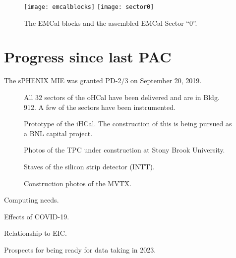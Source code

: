 \begin{figure}[hbt!]
  \centering
  \texttt{[image: emcalblocks]}
  \hfill
  \texttt{[image: sector0]}
  \caption{The EMCal blocks and the assembled EMCal Sector ``0''.}
  \label{fig:emcal}
\end{figure}




\section{Progress since last PAC}
\label{sec:progress}

The sPHENIX MIE was granted PD-2/3 on September 20, 2019.

\begin{figure}[!hbt]
 \begin{center}
        \caption{\label{fig:ohcal}All 32 sectors of the oHCal have
        been delivered and are in Bldg. 912.  A few of the sectors have
        been instrumented.}
 \end{center}
\end{figure}

\begin{figure}[!hbt]
 \begin{center}
        \caption{\label{fig:ihcal}Prototype of the iHCal.  The
        construction of this is being pursued as a BNL capital project.}
 \end{center}
\end{figure}

\begin{figure}[!hbt]
 \begin{center}
        \caption{\label{fig:tpc}Photos of the TPC under construction
        at Stony Brook University.}
 \end{center}
\end{figure}

\begin{figure}[!hbt]
 \begin{center}
        \caption{\label{fig:intt}Staves of the silicon strip detector (INTT).}
 \end{center}
\end{figure}

\begin{figure}[!hbt]
 \begin{center}
        \caption{\label{fig:mvtx}Construction photos of the MVTX.}
 \end{center}
\end{figure}


Computing needs.

Effects of COVID-19.

Relationship to EIC.

Prospects for being ready for data taking in 2023.

